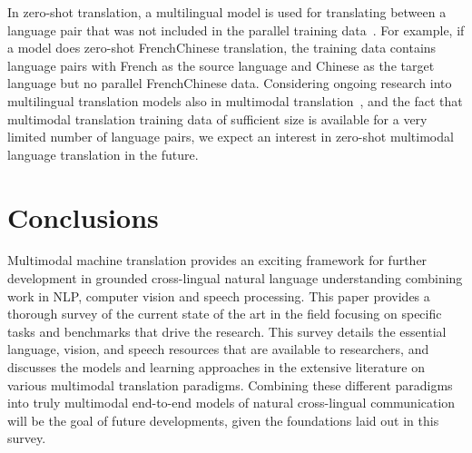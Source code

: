 \documentclass{svjour3}
\newcommand{\eg}[1]{\textit{e.g.}~#1}
\newcommand{\lp}[2]{#1#2}
\begin{document}
In zero-shot translation, a multilingual model is used for translating between a language pair that was not included in the parallel training data~\citep{firat-etal-2016-zero,johnson-googles-2016}.
For example, if a model does zero-shot \lp{French}{Chinese} translation,
the training data contains language pairs with French as the source language and Chinese as the target language but no parallel \lp{French}{Chinese} data.
Considering ongoing research into multilingual translation models also in multimodal translation~\citep[\eg{}][]{inaguma2019multilingual},
and the fact that multimodal translation training data of sufficient size is available for a very limited number of language pairs,
we expect an interest in zero-shot multimodal language translation in the future.


























































%
 


\section{Conclusions}
\label{sec:conclusions}


Multimodal machine translation provides an exciting framework for further development in grounded cross-lingual natural language understanding combining work in NLP, computer vision and speech processing. This paper provides a thorough survey of the current state of the art in the field focusing on specific tasks and benchmarks that drive the research. This survey details the essential language, vision, and speech resources that are available to researchers, and discusses the models and learning approaches in the extensive literature on various multimodal translation paradigms. Combining these different paradigms into truly multimodal end-to-end models of natural cross-lingual communication will be the goal of future developments, given the foundations laid out in this survey.
 
\end{document}
